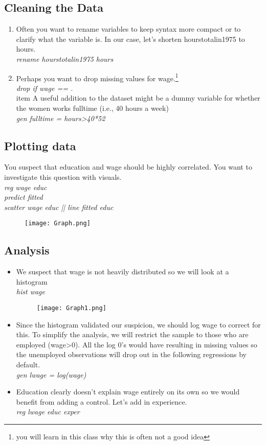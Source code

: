 \documentclass[12pt]{article}%
\begin{document}
\subsection {Cleaning the Data}
\begin{enumerate}
\item Often you want to rename variables to keep syntax more compact or to clarify what the variable is. In our case, let's shorten hourstotalin1975 to hours.
\\
\textit{rename hourstotalin1975 hours}
\item Perhaps you want to drop missing values for wage.\footnote{you will learn in this class why this is often not a good idea}
\\
\textit{drop if wage == .}
\\item A useful addition to the dataset might be a dummy variable for whether the women works fulltime (i.e., 40 hours a week) \\ 
\textit{gen fulltime = hours>40*52}
\end{enumerate}

\subsection{Plotting data}
You suspect that education and wage should be highly correlated. You want to investigate this question with visuals. 
\\
\textit{reg wage educ\\
predict fitted\\
scatter wage educ || line fitted educ
}\\
\begin{figure}[h]\centering
\texttt{[image: Graph.png]}
\end{figure}
\subsection{Analysis}
\begin{itemize}


\item We suspect that wage is not heavily distributed so we will look at a histogram \\ \textit{hist wage}
\begin{figure}[h]\centering
\texttt{[image: Graph1.png]}
\end{figure}
\item Since the histogram validated our suspicion, we should log wage to correct for this. To simplify the analysis, we will restrict the sample to those who are employed (wage>0). All the log 0's would have resulting in missing values so the unemployed observations will drop out in the following regressions by default.\\ \textit{gen lwage = log(wage)}
\item Education clearly doesn't explain wage entirely on its own so we would benefit from adding a control. Let's add in experience. \\ \textit{reg lwage educ exper }
\end{itemize}
\end{document}
